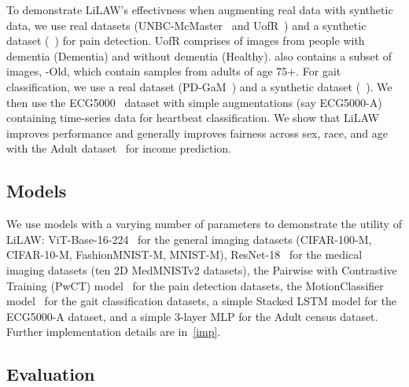 \documentclass{article}
\theoremstyle{plain}
\theoremstyle{definition}
\theoremstyle{remark}
\begin{document}

To demonstrate LiLAW's effectivness when augmenting real data with synthetic data, we use real datasets (UNBC-McMaster~\citep{lucey2011painful} and UofR~\citep{rezaei2020unobtrusive}) and a synthetic dataset (\synpain~\citep{taati2025synpain}) for pain detection. UofR comprises of images from people with dementia (Dementia) and without dementia (Healthy). \synpain also contains a subset of images, \synpain-Old, which contain samples from adults of age 75+. For gait classification, we use a real dataset (PD-GaM~\citep{adeli2025gaitgen}) and a synthetic dataset (\gaitgen~\citep{adeli2025gaitgen}). We then use the ECG5000~\citep{physiobank2000physionet} dataset with simple augmentations (say ECG5000-A) containing time-series data for heartbeat classification. We show that LiLAW improves performance and generally improves fairness across sex, race, and age with the Adult dataset~\citep{adult} for income prediction. %

\subsection{Models}
\label{sec:models}
We use models with a varying number of parameters to demonstrate the utility of LiLAW: ViT-Base-16-224~\citep{vit} for the general imaging datasets (CIFAR-100-M, CIFAR-10-M, FashionMNIST-M, MNIST-M), ResNet-18~\citep{resnet} for the medical imaging datasets (ten 2D MedMNISTv2 datasets), the Pairwise with Contrastive Training (PwCT) model~\cite{rezaei2020unobtrusive} for the pain detection datasets, the MotionClassifier model~\cite{adeli2025gaitgen} for the gait classification datasets, a simple Stacked LSTM model for the ECG5000-A dataset, and a simple 3-layer MLP for the Adult census dataset. Further implementation details are in~\ref{imp}.

\subsection{Evaluation}
\end{document}
